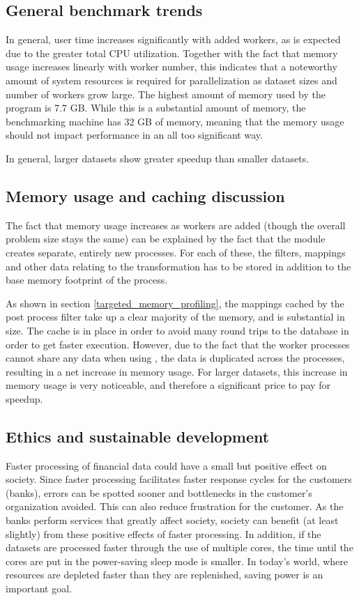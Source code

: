 \subsection{General benchmark trends}
In general, user time increases significantly with added workers, as is expected due to the greater total CPU utilization. Together with the
fact that memory usage increases linearly with worker number, this indicates that a noteworthy amount of system resources is required 
for parallelization as dataset sizes and number of workers grow large. The highest amount of memory used by the program is 7.7 GB. While
this is a substantial amount of memory, the benchmarking machine has 32 GB of memory, meaning that the memory usage should not impact
performance in an all too significant way.

In general, larger datasets show greater speedup than smaller datasets.

\subsection{Memory usage and caching discussion}
The fact that memory usage increases as workers are added (though the overall problem size stays the same)
can be explained by the fact that the  module creates separate, entirely
new processes. For each of these, the filters, mappings and other data relating to the transformation has to be stored in addition to the
base memory footprint of the process. 

As shown in section \ref{targeted_memory_profiling}, the mappings cached by the post process filter take up a clear majority of the memory,
and is substantial in size. The cache is in place in order to avoid many round trips to the database in order to get faster execution. However,
due to the fact that the worker processes cannot share any data when using , the data is duplicated across the processes,
resulting in a net increase in memory usage. For larger datasets, this increase in memory usage is very noticeable, and therefore a
significant price to pay for speedup.

\subsection{Ethics and sustainable development}
Faster processing of financial data could have a small but positive effect on society. Since faster processing facilitates faster response
cycles for the customers (banks), errors can be spotted sooner and bottlenecks in the customer's organization avoided. This can also reduce
frustration for the customer. As the banks perform services that greatly affect society, society can benefit (at least slightly) from these
positive effects of faster processing. In addition, if the datasets are processed faster through the use of multiple cores, the time until
the cores are put in the power-saving sleep mode is smaller. In today's world, where resources are depleted faster than they are replenished,
saving power is an important goal.

